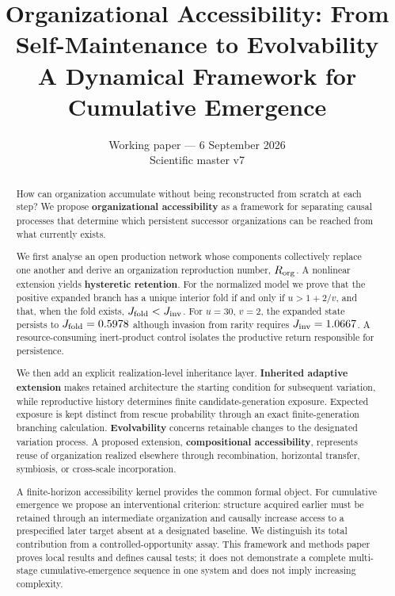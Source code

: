 \documentclass[11pt,a4paper]{article}
\title{\textbf{Organizational Accessibility: From Self-Maintenance to Evolvability}\\[0.5em]
\large A Dynamical Framework for Cumulative Emergence}
\author{} %
\date{Working paper --- 6 September 2026\\\small Scientific master v7}
\begin{document}
\maketitle

\begin{abstract}
How can organization accumulate without being reconstructed from scratch at each step? We propose \textbf{organizational accessibility} as a framework for separating causal processes that determine which persistent successor organizations can be reached from what currently exists.

We first analyse an open production network whose components collectively replace one another and derive an organization reproduction number, $R_{\rm org}$. A nonlinear extension yields \textbf{hysteretic retention}. For the normalized model we prove that the positive expanded branch has a unique interior fold if and only if $u>1+2/v$, and that, when the fold exists, $J_{\rm fold}<J_{\rm inv}$. For $u=30$, $v=2$, the expanded state persists to $J_{\rm fold}=0.5978$ although invasion from rarity requires $J_{\rm inv}=1.0667$. A resource-consuming inert-product control isolates the productive return responsible for persistence.

We then add an explicit realization-level inheritance layer. \textbf{Inherited adaptive extension} makes retained architecture the starting condition for subsequent variation, while reproductive history determines finite candidate-generation exposure. Expected exposure is kept distinct from rescue probability through an exact finite-generation branching calculation. \textbf{Evolvability} concerns retainable changes to the designated variation process. A proposed extension, \textbf{compositional accessibility}, represents reuse of organization realized elsewhere through recombination, horizontal transfer, symbiosis, or cross-scale incorporation.

A finite-horizon accessibility kernel provides the common formal object. For cumulative emergence we propose an interventional criterion: structure acquired earlier must be retained through an intermediate organization and causally increase access to a prespecified later target absent at a designated baseline. We distinguish its total contribution from a controlled-opportunity assay. This framework and methods paper proves local results and defines causal tests; it does not demonstrate a complete multi-stage cumulative-emergence sequence in one system and does not imply increasing complexity.
\end{abstract}
\end{document}
